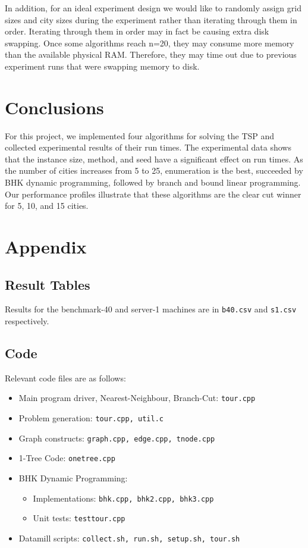 \documentclass[11pt]{article}
\begin{document}
	In addition, for an ideal experiment design we would like to randomly assign grid sizes and city sizes during the experiment rather than iterating through them in order. Iterating through them in order may in fact be causing extra disk swapping. Once some algorithms reach n=20, they may consume more memory than the available physical RAM. Therefore, they may time out due to previous experiment runs that were swapping memory to disk. 
	
	\section{Conclusions}
	\label{sec:conclusions}
	For this project, we implemented four algorithms for solving the TSP and collected experimental results of their run times. The experimental data shows that the instance size, method, and seed have a significant effect on run times. As the number of cities increases from 5 to 25, enumeration is the best, succeeded by BHK dynamic programming, followed by branch and bound linear programming. Our performance profiles illustrate that these algorithms are the clear cut winner for 5, 10, and 15 cities. 
	
	
	\nocite{*}
	
	
	
	\section*{Appendix}
	\subsection*{Result Tables}

	Results for the benchmark-40 and server-1 machines are in \texttt{b40.csv} and \texttt{s1.csv} respectively.	
	
	\subsection*{Code}
	Relevant code files are as follows:
	
	\begin{itemize}
		\item Main program driver, Nearest-Neighbour, Branch-Cut: \texttt{tour.cpp}
		\item Problem generation: \texttt{tour.cpp, util.c}
		\item Graph constructs: \texttt{graph.cpp, edge.cpp, tnode.cpp}
		\item 1-Tree Code: \texttt{onetree.cpp}
		\item BHK Dynamic Programming:
		\begin{itemize}
			\item Implementations: \texttt{bhk.cpp, bhk2.cpp, bhk3.cpp}
			\item Unit tests: \texttt{test{\textunderscore}tour.cpp}
		\end{itemize}
		\item Datamill scripts: \texttt{collect.sh, run.sh, setup.sh, tour.sh}
	\end{itemize}
	
	
	
\end{document}
